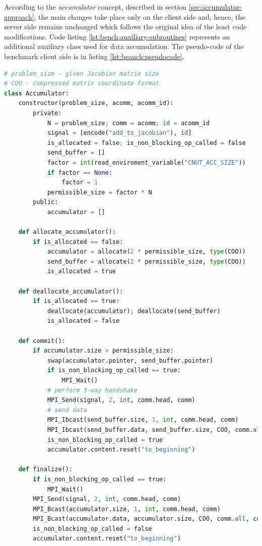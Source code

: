 According to the \textit{accumulator} concept, described in section \ref{sec:accumulator-approach}, the main changes take place only on the client side and, hence, the server side remains unchanged which follows the original idea of the least code modifications. Code listing \ref{lst:bench:auxiliary-subroutines} represents an additional auxiliary class used for data accumulation. The pseudo-code of the benchmark client side is in listing \ref{lst:beanch:pseudocode}.\\ 


\begin{minipage}{\linewidth}
\begin{lstlisting}[language=python, caption={Pseudocode of an auxiliary \textit{Accumulator} class}, frame=single, label={lst:bench:auxiliary-subroutines}]
# problem_size - given Jacobian matrix size
# COO - compressed matrix coordinate format
class Accumulator:
	constructor(problem_size, acomm, acomm_id):
		private:
			N = problem_size; comm = acomm; id = acomm_id
			signal = [encode("add_to_jacobian"), id]
			is_allocated = false; is_non_blocking_op_called = false
			send_buffer = []
			factor = int(read_enviroment_variable("CNUT_ACC_SIZE"))
			if factor == None:
				factor = 1	
			permissible_size = factor * N	
		public: 
			accumulator = []
		
	def allocate_accumulator():
		if is_allocated == false:
			accumulator = allocate(2 * permissible_size, type(COO))			
			send_buffer = allocate(2 * permissible_size, type(COO))
			is_allocated = true

	def deallocate_accumulator():
		if is_allocated == true:
			deallocate(accumulator); deallocate(send_buffer)
			is_allocated = false
	
	def commit():
		if accumulator.size > permissible_size:
			swap(accumulator.pointer, send_buffer.pointer)
			if is_non_blocking_op_called == true:
				MPI_Wait()
			# perform 3-way handshake
			MPI_Send(signal, 2, int, comm.head, comm)
			# send data
			MPI_Ibcast(send_buffer.size, 1, int, comm.head, comm)
			MPI_Ibcast(send_buffer.data, send_buffer.size, COO, comm.all, comm)
			is_non_blocking_op_called = true
			accumulator.content.reset("to_beginning")
					
	def finalize():
		if is_non_blocking_op_called == true:
			MPI_Wait()
		MPI_Send(signal, 2, int, comm.head, comm)
		MPI_Bcast(accumulator.size, 1, int, comm.head, comm)
		MPI_Bcast(accumulator.data, accumulator.size, COO, comm.all, comm)
		is_non_blocking_op_called = false
		accumulator.content.reset("to_beginning")
\end{lstlisting}
\end{minipage}





